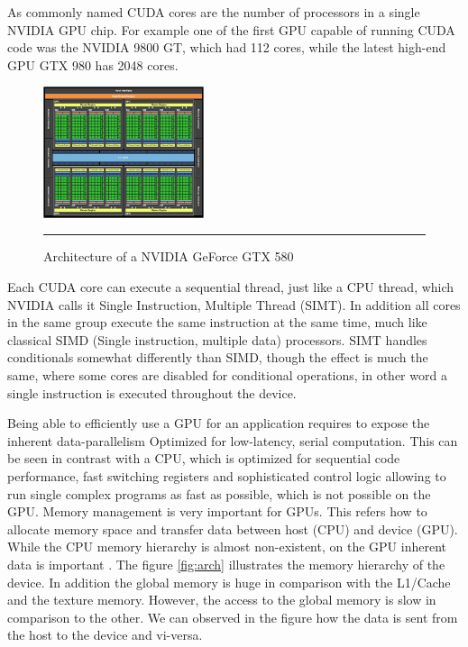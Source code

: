 As commonly named CUDA cores are the number of processors in a single NVIDIA GPU chip. For example one of the first GPU capable of running CUDA code was the NVIDIA 9800 GT, which had 112 cores, while the latest high-end GPU GTX 980 has 2048 cores.

\begin{figure}[htbp]
	\centering
		\includegraphics[width=0.42\textwidth]{Figures/GPU_CPU.png}
		\rule{35em}{0.5pt}
	\caption[Architecture of a GPU]{Architecture of a NVIDIA GeForce GTX 580}
	\label{fig:gpu_cpu}
\end{figure}


Each CUDA core can execute a sequential thread, just like a CPU thread, which NVIDIA calls it Single Instruction, Multiple Thread (SIMT). In addition all cores in the same group execute the same instruction at the same time, much like classical SIMD (Single instruction, multiple data) processors. SIMT handles conditionals somewhat differently than SIMD, though the effect is much the same, where some cores are disabled for conditional operations, in other word a single instruction is executed throughout the device.

Being able to efficiently use a GPU for an application requires to expose the inherent data-parallelism Optimized for low-latency, serial computation. This can be seen in contrast with a CPU, which is optimized for sequential code performance, fast switching registers  and sophisticated control logic allowing to run single complex programs as fast as possible, which is not possible on the GPU. Memory management is very important for GPUs. This refers how to allocate memory space and transfer data between host (CPU) and device (GPU). While the CPU memory hierarchy is almost non-existent, on the GPU inherent data is important \cite{hwu}. The figure \ref{fig:arch} illustrates the memory hierarchy of the device. In addition the global memory is huge in comparison with the L1/Cache and the texture memory. However, the access to the global memory is slow in comparison to the other. We can observed in the figure how the data is sent from the host to the device and vi-versa.

